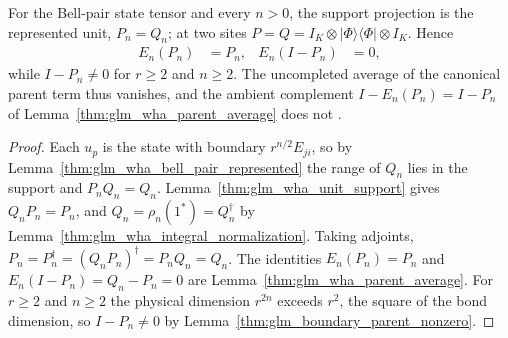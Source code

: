 \begin{lemma}
    \label{thm:glm_wha_bell_pair_parent}
    \leanok
    For the Bell-pair state tensor and every $n>0$, the support projection is
    the represented unit, $P_n=Q_n$; at two sites
    $P=Q=I_K\otimes|\Phi\rangle\langle\Phi|\otimes I_K$. Hence
    \begin{align*}
        E_n(P_n) & =P_n, & E_n(I-P_n) & =0,
    \end{align*}
    while $I-P_n\neq0$ for $r\geq2$ and $n\geq2$. The uncompleted average of
    the canonical parent term thus vanishes, and the ambient complement
    $I-E_n(P_n)=I-P_n$ of Lemma~\ref{thm:glm_wha_parent_average} does not
    \cite{gap:glm23_wha_parent_completion}.
\end{lemma}
\begin{proof}
    \leanok
    Each $u_p$ is the state with boundary $r^{n/2}E_{ji}$, so by
    Lemma~\ref{thm:glm_wha_bell_pair_represented} the range of $Q_n$ lies in
    the support and $P_nQ_n=Q_n$. Lemma~\ref{thm:glm_wha_unit_support}
    gives $Q_nP_n=P_n$, and $Q_n=\rho_n(1^*)=Q_n^\dagger$ by
    Lemma~\ref{thm:glm_wha_integral_normalization}. Taking adjoints,
    $P_n=P_n^\dagger=(Q_nP_n)^\dagger=P_nQ_n=Q_n$. The identities
    $E_n(P_n)=P_n$ and $E_n(I-P_n)=Q_n-P_n=0$ are
    Lemma~\ref{thm:glm_wha_parent_average}. For $r\geq2$ and $n\geq2$ the
    physical dimension $r^{2n}$ exceeds $r^2$, the square of the bond
    dimension, so $I-P_n\neq0$ by Lemma~\ref{thm:glm_boundary_parent_nonzero}.
\end{proof}
